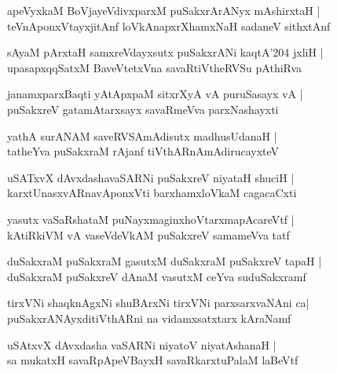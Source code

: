 \documentclass[twoside,12pt,openright]{book}
\newcounter{shloka}[chapter]
\begin{document}
\begin{shloka}
apeVyxkaM BoVjayeVdivxparxM puSakxrArANyx mAshirxtaH |\\
teVnAponxVtayxjitAnf loVkAnapxrXhamxNaH sadaneV sithxtAnf
\end{shloka}

\begin{shloka}
sAyaM pArxtaH samxreVdayxsutx puSakxrANi kaqtA\char'204 jxliH |\\
upasapxqqSatxM BaveVtetxVna savaRtiVtheRVSu pAthiRva 
\end{shloka}

\begin{shloka}
janamxparxBaqti yAtApxpaM sitxrXyA vA puruSasayx vA |\\
puSakxreV gatamAtarxsayx savaRmeVva parxNashayxti
\end{shloka}

\begin{shloka}
yathA surANAM saveRVSAmAdisutx madhusUdanaH |\\
tatheYva  puSakxraM rAjanf tiVthARnAmAdirucayxteV 
\end{shloka}

\begin{shloka}
uSATxvX dAvxdashavaSARNi puSakxreV niyataH shuciH |\\
karxtUnasxvARnavAponxVti barxhamxloVkaM cagacaCxti 
\end{shloka}

\begin{shloka}
yasutx vaSaRshataM puNayxmaginxhoVtarxmapAcareVtf |\\
kAtiRkiVM vA vaseVdeVkAM puSakxreV samameVva tatf
\end{shloka}

\begin{shloka}
duSakxraM puSakxraM gasutxM duSakxraM puSakxreV tapaH |\\
duSakxraM puSakxreV dAnaM vasutxM ceYva suduSakxramf
\end{shloka}

\begin{shloka}
tirxVNi shaqknAgxNi shuBArxNi tirxVNi parxsarxvaNAni ca|\\
puSakxrANAyxditiVthARni na vidamxsatxtarx kAraNamf 
\end{shloka}

\begin{shloka}
uSAtxvX dAvxdasha vaSARNi niyatoV niyatAshanaH |\\
sa mukatxH savaRpApeVBayxH savaRkarxtuPalaM laBeVtf
\end{shloka}
\end{document}
